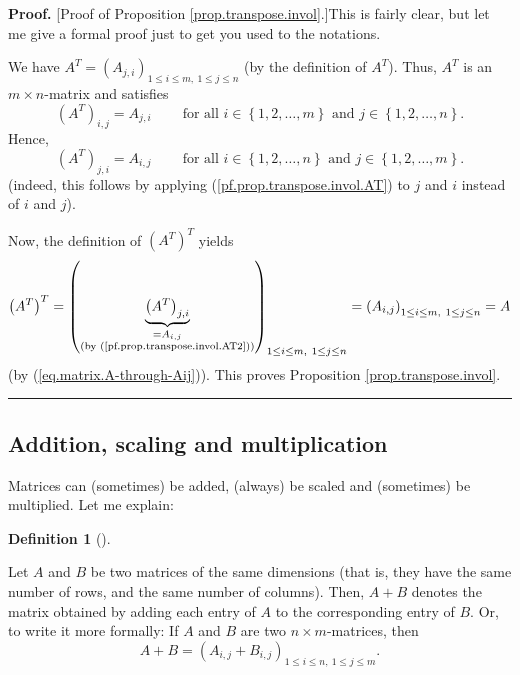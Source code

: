 \documentclass[numbers=enddot,12pt,final,onecolumn,notitlepage]{scrartcl}%
\theoremstyle{definition}
\newtheorem{defi}[theo]{Definition}
\newenvironment{definition}[1][]
{\begin{defi}[#1]\begin{leftbar}}
{\end{leftbar}\end{defi}}
\newenvironment{proof}[1][Proof]{\noindent\textbf{#1.} }{\ \rule{0.5em}{0.5em}}
\begin{document}
\begin{proof}
[Proof of Proposition \ref{prop.transpose.invol}.]This is fairly clear, but
let me give a formal proof just to get you used to the notations.

We have $A^{T}=\left(  A_{j,i}\right)  _{1\leq i\leq m,\ 1\leq j\leq n}$ (by
the definition of $A^{T}$). Thus, $A^{T}$ is an $m\times n$-matrix and
satisfies%
\begin{equation}
\left(  A^{T}\right)  _{i,j}=A_{j,i}\ \ \ \ \ \ \ \ \ \ \text{for all }%
i\in\left\{  1,2,\ldots,m\right\}  \text{ and }j\in\left\{  1,2,\ldots
,n\right\}  . \label{pf.prop.transpose.invol.AT}%
\end{equation}
Hence,%
\begin{equation}
\left(  A^{T}\right)  _{j,i}=A_{i,j}\ \ \ \ \ \ \ \ \ \ \text{for all }%
i\in\left\{  1,2,\ldots,n\right\}  \text{ and }j\in\left\{  1,2,\ldots
,m\right\}  . \label{pf.prop.transpose.invol.AT2}%
\end{equation}
(indeed, this follows by applying (\ref{pf.prop.transpose.invol.AT}) to $j$
and $i$ instead of $i$ and $j$).

Now, the definition of $\left(  A^{T}\right)  ^{T}$ yields%
\[
\left(  A^{T}\right)  ^{T}=\left(  \underbrace{\left(  A^{T}\right)  _{j,i}%
}_{\substack{=A_{i,j}\\\text{(by (\ref{pf.prop.transpose.invol.AT2}))}%
}}\right)  _{1\leq i\leq m,\ 1\leq j\leq n}=\left(  A_{i,j}\right)  _{1\leq
i\leq m,\ 1\leq j\leq n}=A
\]
(by (\ref{eq.matrix.A-through-Aij})). This proves Proposition
\ref{prop.transpose.invol}.
\end{proof}

\subsection{Addition, scaling and multiplication}

Matrices can (sometimes) be added, (always) be scaled and (sometimes) be
multiplied. Let me explain:

\begin{definition}
\label{def.matrix-add}Let $A$ and $B$ be two matrices of the same dimensions
(that is, they have the same number of rows, and the same number of columns).
Then, $A+B$ denotes the matrix obtained by adding each entry of $A$ to the
corresponding entry of $B$. Or, to write it more formally: If $A$ and $B$ are
two $n\times m$-matrices, then%
\[
A+B=\left(  A_{i,j}+B_{i,j}\right)  _{1\leq i\leq n,\ 1\leq j\leq m}.
\]

\end{definition}
\end{document}
